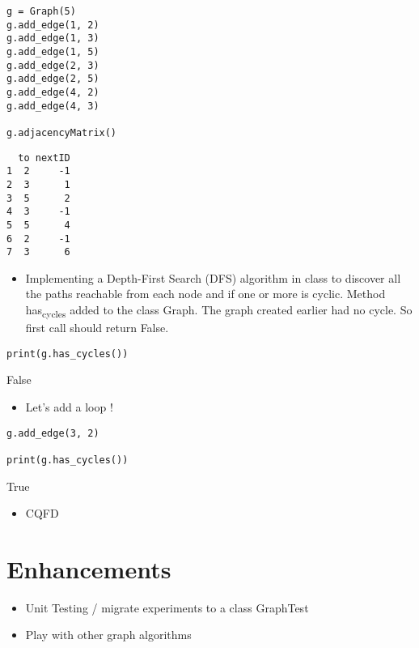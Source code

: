 \documentclass[11pt]{article}
\begin{document}
\begin{verbatim}
g = Graph(5)
g.add_edge(1, 2)
g.add_edge(1, 3)
g.add_edge(1, 5)
g.add_edge(2, 3)
g.add_edge(2, 5)
g.add_edge(4, 2)
g.add_edge(4, 3)

g.adjacencyMatrix()
\end{verbatim}

\begin{verbatim}
  to nextID
1  2     -1
2  3      1
3  5      2
4  3     -1
5  5      4
6  2     -1
7  3      6
\end{verbatim}


\begin{itemize}
\item Implementing a Depth-First Search (DFS) algorithm in class to discover all the paths reachable from
each node and if one or more is cyclic. Method has\textsubscript{cycles} added to the class
Graph.
The graph created earlier had no cycle. So first call should return False.
\end{itemize}

\begin{verbatim}
print(g.has_cycles())
\end{verbatim}

False

\begin{itemize}
\item Let's add a loop !
\end{itemize}

\begin{verbatim}
g.add_edge(3, 2)

print(g.has_cycles())
\end{verbatim}

True

\begin{itemize}
\item CQFD
\end{itemize}

\section{Enhancements}
\label{sec:org98257a6}
\begin{itemize}
\item Unit Testing / migrate experiments to a class GraphTest
\item Play with other graph algorithms
\end{itemize}
\end{document}
